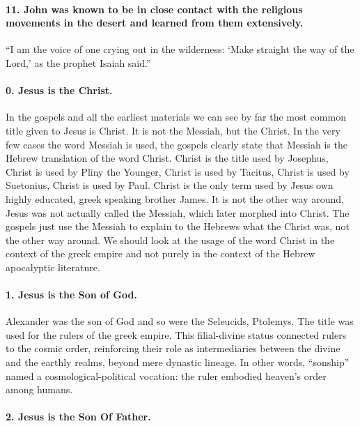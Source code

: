 \paragraph{11.
John was known to be in close contact with the religious movements in the desert and learned from them extensively.}\label{par:john-was-known-to-be-in-close-contact-with-the-religious-movements-in-the-desert-and-learned-from-them-extensively.}

``I am the voice of one crying out in the wilderness: `Make straight the way of the Lord,' as the prophet Isaiah said.''

\paragraph{0.
Jesus is the Christ.}\label{par:jesus-is-the-christ.}
In the gospels and all the earliest materials we can see by far the most common title given to Jesus is Christ.
It is not the Messiah, but the Christ.
In the very few cases the word Messiah is used, the gospels clearly state that Messiah is the Hebrew translation of the word Christ.
Christ is the title used by Josephus, Christ is used by Pliny the Younger, Christ is used by Tacitus, Christ is used by Suetonius, Christ is used by Paul.
Christ is the only term used by Jesus own highly educated, greek speaking brother James.
It is not the other way around, Jesus was not actually called the Messiah, which later morphed into Christ.
The gospels just use the Messiah to explain to the Hebrews what the Christ was, not the other way around.
We should look at the usage of the word Christ in the context of the greek empire and not purely in the context of the Hebrew apocalyptic literature.

\paragraph{1.
Jesus is the Son of God.}\label{par:jesus-is-the-son-of-god.}
Alexander was the son of God and so were the Seleucids, Ptolemys.
The title was used for the rulers of the greek empire.
This filial-divine status connected rulers to the cosmic order, reinforcing their role as intermediaries between the divine and the earthly realms, beyond mere dynastic lineage.
In other words, “sonship” named a cosmological-political vocation: the ruler embodied heaven’s order among humans.

\paragraph{2.
Jesus is the Son Of Father.}\label{par:jesus-is-the-son-of-father.}

